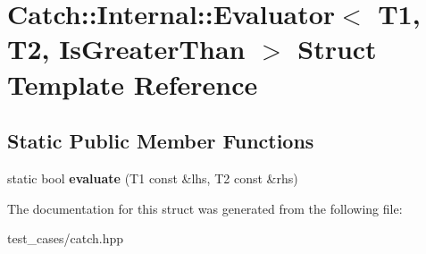 \hypertarget{structCatch_1_1Internal_1_1Evaluator_3_01T1_00_01T2_00_01IsGreaterThan_01_4}{}\section{Catch\+:\+:Internal\+:\+:Evaluator$<$ T1, T2, Is\+Greater\+Than $>$ Struct Template Reference}
\label{structCatch_1_1Internal_1_1Evaluator_3_01T1_00_01T2_00_01IsGreaterThan_01_4}
\subsection*{Static Public Member Functions}
\begin{DoxyCompactItemize}
\item 
\mbox{\label{structCatch_1_1Internal_1_1Evaluator_3_01T1_00_01T2_00_01IsGreaterThan_01_4_a55745f74f09ac5c61bd3d592ca5560af}} 
static bool {\bfseries evaluate} (T1 const \&lhs, T2 const \&rhs)
\end{DoxyCompactItemize}


The documentation for this struct was generated from the following file\+:\begin{DoxyCompactItemize}
\item 
test\+\_\+cases/catch.\+hpp\end{DoxyCompactItemize}
